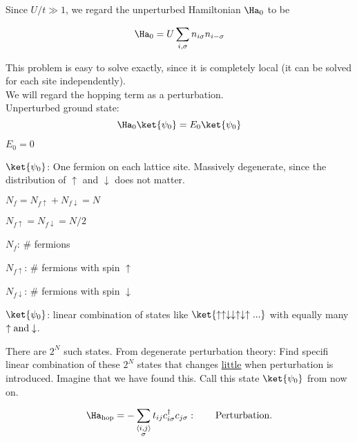 Since $U/t \gg 1$, we regard the unperturbed Hamiltonian $\Ha_0$ to be

\begin{equation}
    \Ha_0 = U\sum_{i, \sigma} n_{i \sigma} n_{i -\sigma}
\end{equation}

 This problem is easy to solve exactly, since it is completely local (it can be solved for each site independently).\\

 We will regard the hopping term as a perturbation. \\

Unperturbed ground state:
\begin{equation}
    \Ha_0 \ket{\psi_0} = E_0 \ket{\psi_0}
\end{equation}

\begin{description}
    \item $E_0 = 0$
    \item $\ket{\psi_0}$: One fermion on each lattice site. Massively degenerate, since the distribution of $\uparrow$ and $\downarrow$ does not matter.

    \item $N_f = N_{f \uparrow} + N_{f \downarrow} = N $
    \item $N_{f \uparrow} = N_{f \downarrow} = N/2$
    
    \item $N_f$: \# fermions
    \item $N_{f\uparrow}$: \# fermions with spin $\uparrow$
    \item $N_{f\downarrow}$: \# fermions with spin $\downarrow$

    \item $\ket{\psi_0}$: linear combination of states like $\ket{\uparrow\uparrow\downarrow\downarrow\uparrow\downarrow
    \uparrow...}$ with equally many $\uparrow \rm{and} \downarrow$.
\end{description}

There are $2^N$ such states. From degenerate perturbation theory: Find specifi linear combination of these $2^N$ states that changes \underline{little} when perturbation is introduced. Imagine that we have found this. Call this state $\ket{\psi_0}$ from now on.

\begin{equation}
    \Ha_{\text{hop}} = - \sum_{\substack{\langle i, j \rangle \\ \sigma}} t_{ij} c_{i\sigma}^\dagger c_{j\sigma}: \qquad \text{Perturbation.}
\end{equation}

